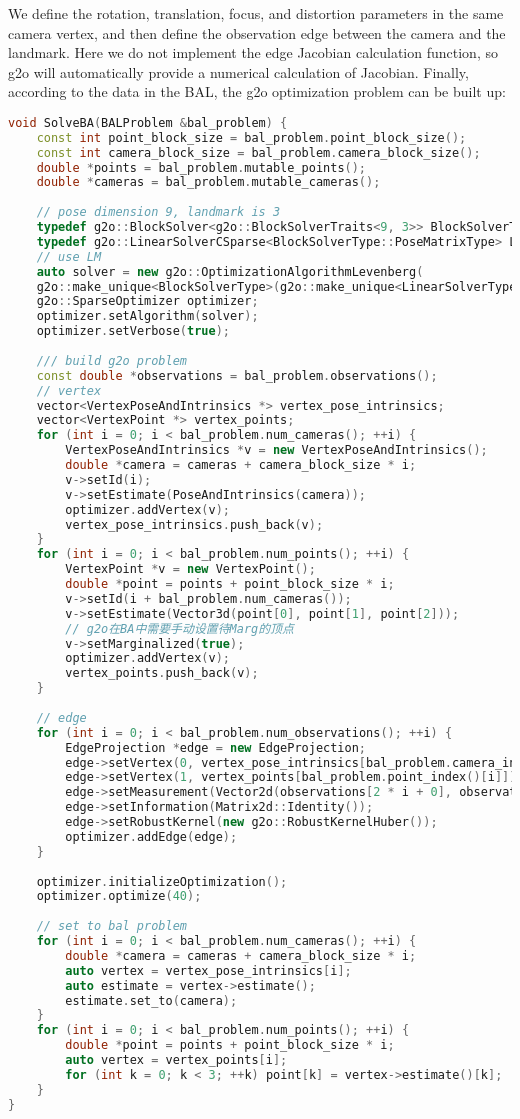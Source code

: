 We define the rotation, translation, focus, and distortion parameters in the same camera vertex, and then define the observation edge between the camera and the landmark. Here we do not implement the edge Jacobian calculation function, so g2o will automatically provide a numerical calculation of Jacobian. Finally, according to the data in the BAL, the g2o optimization problem can be built up:
\begin{lstlisting}[language=c++,caption=slambook2/ch9/bundle_adjustment_g2o.cpp(fragment)]
void SolveBA(BALProblem &bal_problem) {
	const int point_block_size = bal_problem.point_block_size();
	const int camera_block_size = bal_problem.camera_block_size();
	double *points = bal_problem.mutable_points();
	double *cameras = bal_problem.mutable_cameras();
	
	// pose dimension 9, landmark is 3
	typedef g2o::BlockSolver<g2o::BlockSolverTraits<9, 3>> BlockSolverType;
	typedef g2o::LinearSolverCSparse<BlockSolverType::PoseMatrixType> LinearSolverType;
	// use LM
	auto solver = new g2o::OptimizationAlgorithmLevenberg(
	g2o::make_unique<BlockSolverType>(g2o::make_unique<LinearSolverType>()));
	g2o::SparseOptimizer optimizer;
	optimizer.setAlgorithm(solver);
	optimizer.setVerbose(true);
	
	/// build g2o problem
	const double *observations = bal_problem.observations();
	// vertex
	vector<VertexPoseAndIntrinsics *> vertex_pose_intrinsics;
	vector<VertexPoint *> vertex_points;
	for (int i = 0; i < bal_problem.num_cameras(); ++i) {
		VertexPoseAndIntrinsics *v = new VertexPoseAndIntrinsics();
		double *camera = cameras + camera_block_size * i;
		v->setId(i);
		v->setEstimate(PoseAndIntrinsics(camera));
		optimizer.addVertex(v);
		vertex_pose_intrinsics.push_back(v);
	}
	for (int i = 0; i < bal_problem.num_points(); ++i) {
		VertexPoint *v = new VertexPoint();
		double *point = points + point_block_size * i;
		v->setId(i + bal_problem.num_cameras());
		v->setEstimate(Vector3d(point[0], point[1], point[2]));
		// g2o在BA中需要手动设置待Marg的顶点
		v->setMarginalized(true);
		optimizer.addVertex(v);
		vertex_points.push_back(v);
	}
	
	// edge
	for (int i = 0; i < bal_problem.num_observations(); ++i) {
		EdgeProjection *edge = new EdgeProjection;
		edge->setVertex(0, vertex_pose_intrinsics[bal_problem.camera_index()[i]]);
		edge->setVertex(1, vertex_points[bal_problem.point_index()[i]]);
		edge->setMeasurement(Vector2d(observations[2 * i + 0], observations[2 * i + 1]));
		edge->setInformation(Matrix2d::Identity());
		edge->setRobustKernel(new g2o::RobustKernelHuber());
		optimizer.addEdge(edge);
	}
	
	optimizer.initializeOptimization();
	optimizer.optimize(40);
	
	// set to bal problem
	for (int i = 0; i < bal_problem.num_cameras(); ++i) {
		double *camera = cameras + camera_block_size * i;
		auto vertex = vertex_pose_intrinsics[i];
		auto estimate = vertex->estimate();
		estimate.set_to(camera);
	}
	for (int i = 0; i < bal_problem.num_points(); ++i) {
		double *point = points + point_block_size * i;
		auto vertex = vertex_points[i];
		for (int k = 0; k < 3; ++k) point[k] = vertex->estimate()[k];
	}
}
\end{lstlisting}

